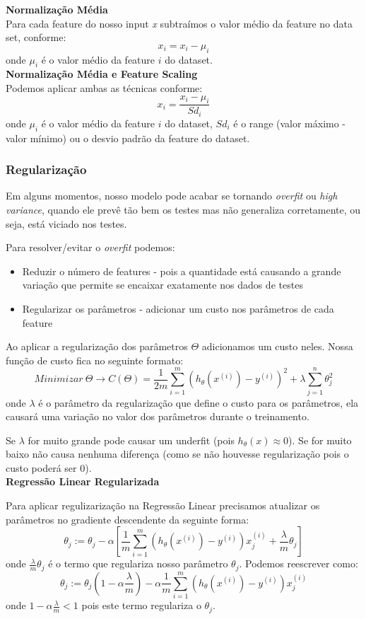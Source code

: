 \documentclass[11pt,a4paper,leqno]{article}
\begin{document}
\textbf{Normalização Média}\\
Para cada feature do nosso input \emph{x} subtraímos o valor médio da feature no data set, conforme:
\[
x_i = x_i - \mu_i
\]
onde $\mu_i$ é o valor médio da feature $i$ do dataset.
\\

\textbf{Normalização Média e Feature Scaling}\\
Podemos aplicar ambas as técnicas conforme:
\[
x_i = \frac{x_i - \mu_i}{Sd_i}
\]
onde $\mu_i$ é o valor médio da feature $i$ do dataset, $Sd_i$ é o range (valor máximo - valor mínimo) ou o desvio padrão da feature do dataset.



\subsubsection{Regularização}
Em alguns momentos, nosso modelo pode acabar se tornando \emph{overfit} ou \emph{high variance}, quando ele prevê tão bem os testes mas não generaliza corretamente, ou seja, está viciado nos testes.

Para resolver/evitar o \emph{overfit} podemos:
\begin{itemize}
\item Reduzir o número de features - pois a quantidade está causando a grande variação que permite se encaixar exatamente nos dados de testes
\item Regularizar os parâmetros - adicionar um custo nos parâmetros de cada feature
\end{itemize}

Ao aplicar a regularização dos parâmetros $\Theta$ adicionamos um custo neles.
Nossa função de custo fica no seguinte formato:
\[
Minimizar \ \Theta \rightarrow C (\Theta) = \frac{1}{2m} \sum_{i=1}^m ( h_\theta (x^{(i)}) - y^{(i)}) ^ 2 + \lambda \sum_{j=1}^n \theta_j^2
\]
onde $\lambda$ é o parâmetro da regularização que define o custo para os parâmetros, ela causará uma variação no valor dos parâmetros durante o treinamento.

Se $\lambda$ for muito grande pode causar um underfit (pois $h_\theta (x) \approx 0$). Se for muito baixo não causa nenhuma diferença (como se não houvesse regularização pois o custo poderá ser 0).\\


\textbf{Regressão Linear Regularizada}

Para aplicar regulizarização na Regressão Linear precisamos atualizar os parâmetros no gradiente descendente da seguinte forma:
\[
\theta_j := \theta_j - \alpha	 \left[ \frac{1}{m} \sum_{i=1}^m ( h_\theta(x^{(i)}) - y^{(i)})x_j^{(i)} + \frac{\lambda}{m} \theta_j \right]
\]
onde $\frac{\lambda}{m} \theta_j$ é o termo que regulariza nosso parâmetro $\theta_j$.
Podemos reescrever como:
\[
\theta_j := \theta_j (1 - \alpha \frac{\lambda}{m}) - \alpha	 \frac{1}{m} \sum_{i=1}^m ( h_\theta(x^{(i)}) - y^{(i)})x_j^{(i)}
\]
onde $1 - \alpha \frac{\lambda}{m} < 1$ pois este termo regulariza o $\theta_j$.
\end{document}
